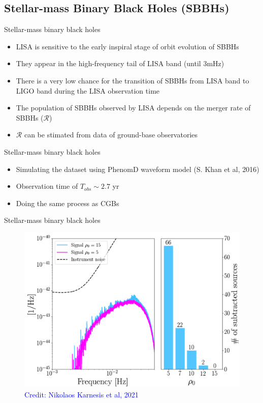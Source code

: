 \documentclass[pdf]{beamer}
\newcommand{\credit}[1]{\tiny{\textcolor{blue}{Credit: #1}}}
\begin{document}
\subsection{Stellar-mass Binary Black Holes (SBBHs)}
\begin{frame}{Stellar-mass binary black holes}
\begin{itemize}
\item LISA is sensitive to the early inspiral stage of orbit evolution of SBBHs
\item They appear in the high-frequency tail of LISA band (until $3\mathrm{mHz}$)
\item There is a very low chance for the transition of SBBHs from LISA band to LIGO band during the LISA observation time
\item The population of SBBHs observed by LISA depends on the merger rate of SBBHs ($\mathcal{R}$)
\item $\mathcal{R}$ can be stimated from data of ground-base observatories
\end{itemize}
\end{frame}

\begin{frame}{Stellar-mass binary black holes}
\begin{itemize}
\item Simulating the dataset using PhenomD waveform model (S. Khan et al, 2016)
\item Observation time of $T_{obs} \sim 2.7$ yr
\item Doing the same process as CGBs
\end{itemize}
\end{frame}

\begin{frame}{Stellar-mass binary black holes}
\begin{figure}
\includegraphics[width=.8\textwidth]{fig/SMBHs.png}
\caption*{\credit{Nikolaos Karnesis et al, 2021}}
\end{figure}
\end{frame}
\end{document}
